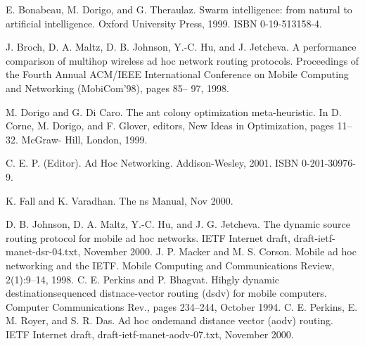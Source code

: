 \newpage
\begin{thebibliography}{9}
E. Bonabeau, M. Dorigo, and G. Theraulaz. Swarm intelligence:
from natural to artificial intelligence. Oxford University
Press, 1999. ISBN 0-19-513158-4.
 
J. Broch, D. A. Maltz, D. B. Johnson, Y.-C. Hu, and
J. Jetcheva. A performance comparison of multihop wireless
ad hoc network routing protocols. Proceedings of the
Fourth Annual ACM/IEEE International Conference on Mobile
Computing and Networking (MobiCom’98), pages 85–
97, 1998.
 
M. Dorigo and G. Di Caro. The ant colony optimization
meta-heuristic. In D. Corne, M. Dorigo, and F. Glover, editors,
New Ideas in Optimization, pages 11–32. McGraw-
Hill, London, 1999.

\bibitem{}
C. E. P. (Editor). Ad Hoc Networking. Addison-Wesley,
2001. ISBN 0-201-30976-9.

\bibitem{}
K. Fall and K. Varadhan. The ns Manual, Nov 2000.

\bibitem{}
D. B. Johnson, D. A. Maltz, Y.-C. Hu, and J. G. Jetcheva.
The dynamic source routing protocol for mobile ad hoc
networks. IETF Internet draft, draft-ietf-manet-dsr-04.txt,
November 2000.
\bibitem{}
J. P. Macker and M. S. Corson. Mobile ad hoc networking
and the IETF. Mobile Computing and Communications
Review, 2(1):9–14, 1998.
\bibitem{}
C. E. Perkins and P. Bhagvat. Hihgly dynamic destinationsequenced
distnace-vector routing (dsdv) for mobile computers.
Computer Communications Rev., pages 234–244,
October 1994.
\bibitem{}
C. E. Perkins, E. M. Royer, and S. R. Das. Ad hoc ondemand
distance vector (aodv) routing. IETF Internet draft,
draft-ietf-manet-aodv-07.txt, November 2000.
\end{thebibliography}





